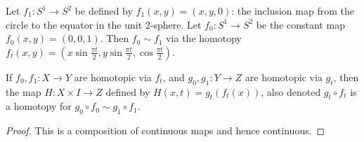 \begin{example}
	Let \( f_1 \colon S^1 \to S^2 \) be defined by \( f_1(x,y) = (x,y,0) \): the inclusion map from the circle to the equator in the unit 2-sphere.
	Let \( f_0 \colon S^1 \to S^2 \) be the constant map \( f_0(x,y) = (0,0,1) \).
	Then \( f_0 \sim f_1 \) via the homotopy \( f_t(x,y) = (x\sin \frac{\pi t}{2}, y \sin \frac{\pi t}{2}, \cos \frac{\pi t}{2}) \).
\end{example}
\begin{lemma}
	If \( f_0, f_1 \colon X \to Y \) are homotopic via \( f_t \), and \( g_0, g_1 \colon Y \to Z \) are homotopic via \( g_t \), then the map \( H \colon X \times I \to Z \) defined by \( H(x,t) = g_t(f_t(x)) \), also denoted \( g_t \circ f_t \) is a homotopy for \( g_0 \circ f_0 \sim g_1 \circ f_1 \).
\end{lemma}
\begin{proof}
	This is a composition of continuous maps and hence continuous.
\end{proof}


